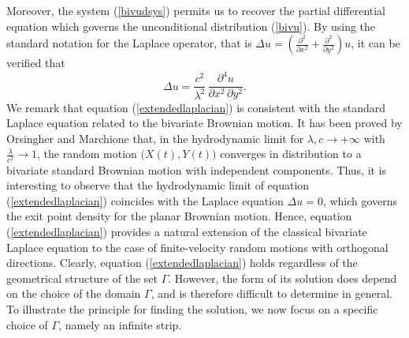 \documentclass{article}
\begin{document}
Moreover, the system (\ref{bivudsys}) permits us to recover the partial differential equation which governs the unconditional distribution (\ref{bivu}). By using the standard notation for the Laplace operator, that is $\Delta u=\left(\frac{\partial^2}{\partial x^2}+\frac{\partial^2}{\partial y^2}\right)u$, it can be verified that \begin{equation}\label{extendedlaplacian}\Delta u =\frac{c^2}{\lambda^2}\,\frac{\partial ^4u}{\partial x^2\,\partial y^2}.\end{equation}
We remark that equation (\ref{extendedlaplacian}) is consistent with the standard Laplace equation related to the bivariate Brownian motion. It has been proved by Orsingher and Marchione \cite{vortex} that, in the hydrodynamic limit for $\lambda,c\to+\infty$ with $\frac{\lambda}{c^2}\to1$, the random motion $\big(X(t),Y(t)\big)$ converges in distribution to a bivariate standard Brownian motion with independent components. Thus, it is interesting to observe that the hydrodynamic limit of equation (\ref{extendedlaplacian}) coincides with the Laplace equation $\Delta u=0$, which governs the exit point density for the planar Brownian motion. Hence, equation (\ref{extendedlaplacian}) provides a natural extension of the classical bivariate Laplace equation to the case of finite-velocity random motions with orthogonal directions. Clearly, equation (\ref{extendedlaplacian}) holds regardless of the geometrical structure of the set $\Gamma$. However, the form of its solution does depend on the choice of the domain $\Gamma$, and is therefore difficult to determine in general. To illustrate the principle for finding the solution, we now focus on a specific choice of $\Gamma$, namely an infinite strip.\\
\end{document}
